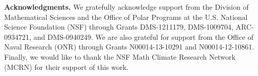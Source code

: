 \documentclass[amsa]{ipart}
\begin{document}
\medskip

{\bf Acknowledgments.}
We gratefully acknowledge support from the Division of Mathematical
  Sciences and the Office of Polar Programs at the U.S. National
  Science Foundation (NSF) through Grants DMS-1211179, DMS-1009704,
  ARC-0934721, and DMS-0940249. We are also grateful for support from
  the Office of Naval Research (ONR) through Grants N00014-13-10291 and
  N00014-12-10861. Finally, we would like to thank the NSF Math Climate
  Research Network (MCRN) for their support of this work. 


\medskip



% 



\end{document}
